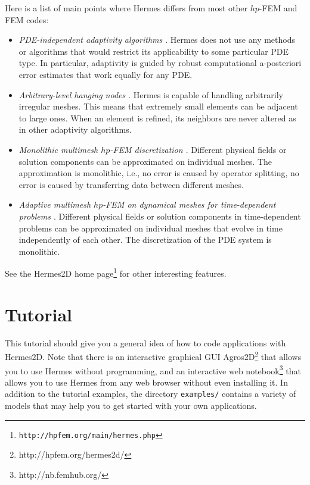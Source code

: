 \documentclass[11pt]{article}
\begin{document}
Here is a list of main points where Hermes differs from most other
$hp$-FEM and FEM codes:
\begin{itemize}
  \item {\em PDE-independent adaptivity algorithms \cite{miro}}. Hermes does not use any methods or algorithms
        that would restrict its applicability to some particular PDE type. In particular, adaptivity is
        guided by robust computational a-posteriori error estimates that work equally for any PDE.
  \item {\em Arbitrary-level hanging nodes \cite{socedo}}. Hermes is capable of handling arbitrarily irregular
        meshes. This means that extremely small elements can be adjacent to large ones. When an element
        is refined, its neighbors are never altered as in other adaptivity algorithms.
  \item {\em Monolithic multimesh $hp$-FEM discretization \cite{multimesh1}}. Different physical fields or
        solution components can be approximated on individual meshes. The approximation is
        monolithic, i.e., no error is caused by operator splitting, no error is caused by transferring data
        between different meshes.
  \item {\em Adaptive multimesh $hp$-FEM on dynamical meshes for time-dependent
        problems \cite{dusoce,sodukru}}. Different physical fields or
        solution components in time-dependent problems can be approximated
        on individual meshes that evolve in time independently of each other.
        The discretization of the PDE system is monolithic.
\end{itemize}
See the Hermes2D home page\footnote{\tt http://hpfem.org/main/hermes.php} for other interesting features.

\section{Tutorial}
\label{ch:tutorial}


This tutorial should give you a general idea of how to code applications with Hermes2D.
Note that there is an interactive graphical GUI Agros2D\footnote{http://hpfem.org/hermes2d/}
that allows you to use Hermes without programming, and an interactive web
notebook\footnote{http://nb.femhub.org/}
that allows you to use Hermes from any web browser without even installing it.
In addition to the tutorial examples, the directory {\tt examples/} contains a variety
of models that may help you to get started with your own applications.
\end{document}
